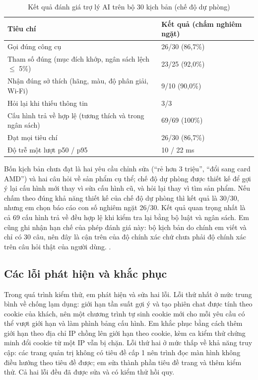 \begin{table}[H]
\centering\small
\begin{tabular}{|L{9cm}|R{4.6cm}|}
\hline
\textbf{Tiêu chí} & \textbf{Kết quả (chấm nghiêm ngặt)} \\ \hline
Gọi đúng công cụ & 26/30 (86,7\%) \\ \hline
Tham số đúng (mục đích khớp, ngân sách lệch $\le$ 5\%) & 23/25 (92,0\%) \\ \hline
Nhận đúng sở thích (hãng, màu, độ phân giải, Wi-Fi) & 9/10 (90,0\%) \\ \hline
Hỏi lại khi thiếu thông tin & 3/3 \\ \hline
Cấu hình trả về hợp lệ (tương thích và trong ngân sách) & 69/69 (100\%) \\ \hline
Đạt mọi tiêu chí & 26/30 (86,7\%) \\ \hline
Độ trễ một lượt p50 / p95 & 10 / 22 ms \\ \hline
\end{tabular}
\caption{Kết quả đánh giá trợ lý AI trên bộ 30 kịch bản (chế độ dự phòng)}
\label{tab:golden}
\end{table}

Bốn kịch bản chưa đạt là hai yêu cầu chỉnh sửa (``rẻ hơn 3 triệu'', ``đổi sang card AMD'') và hai câu hỏi về sản phẩm cụ thể; chế độ dự phòng được thiết kế để gợi ý lại cấu hình mới thay vì sửa cấu hình cũ, và hỏi lại thay vì tìm sản phẩm. Nếu chấm theo đúng khả năng thiết kế của chế độ dự phòng thì kết quả là 30/30, nhưng em chọn báo cáo con số nghiêm ngặt 26/30. Kết quả quan trọng nhất là cả 69 cấu hình trả về đều hợp lệ khi kiểm tra lại bằng bộ luật và ngân sách. Em cũng ghi nhận hạn chế của phép đánh giá này: bộ kịch bản do chính em viết và chỉ có 30 câu, nên đây là cận trên của độ chính xác chứ chưa phải độ chính xác trên câu hỏi thật của người dùng. .

\subsection{Các lỗi phát hiện và khắc phục}

Trong quá trình kiểm thử, em phát hiện và sửa hai lỗi. Lỗi thứ nhất ở mức trung bình về chống lạm dụng: giới hạn tần suất gợi ý và tạo phiên chat được tính theo cookie của khách, nên một chương trình tự sinh cookie mới cho mỗi yêu cầu có thể vượt giới hạn và làm phình bảng cấu hình. Em khắc phục bằng cách thêm giới hạn theo địa chỉ IP chồng lên giới hạn theo cookie, kèm ca kiểm thử chứng minh đổi cookie từ một IP vẫn bị chặn. Lỗi thứ hai ở mức thấp về khả năng truy cập: các trang quản trị không có tiêu đề cấp 1 nên trình đọc màn hình không điều hướng theo tiêu đề được; em sửa thành phần tiêu đề trang và thêm kiểm thử. Cả hai lỗi đều đã được sửa và có kiểm thử hồi quy.

